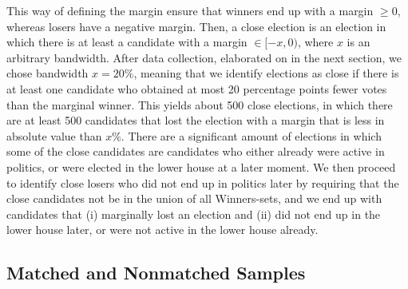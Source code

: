 \documentclass[12pt]{article}
\begin{document}
    This way of defining the margin ensure that winners end up with a margin $\geq 0$, whereas losers have a negative margin. Then, a close election is an election in which there is at least a candidate with a margin $\in [-x, 0)$, where $x$ is an arbitrary bandwidth. After data collection, elaborated on in the next section, we chose bandwidth $x=20\%$, meaning that we identify elections as close if there is at least one candidate who obtained at most 20 percentage points fewer votes than the marginal winner. This yields about 500 close elections, in which there are at least 500 candidates that lost the election with a margin that is less in absolute value than $x\%$. There are a significant amount of elections in which some of the close candidates are candidates who either already were active in politics, or were elected in the lower house at a later moment. We then proceed to identify close losers who did not end up in politics later by requiring that the close candidates not be in the union of all Winners-sets, and we end up with candidates that (i) marginally lost an election and (ii) did not end up in the lower house later, or were not active in the lower house already. 

\subsection{Matched and Nonmatched Samples}
\end{document}
